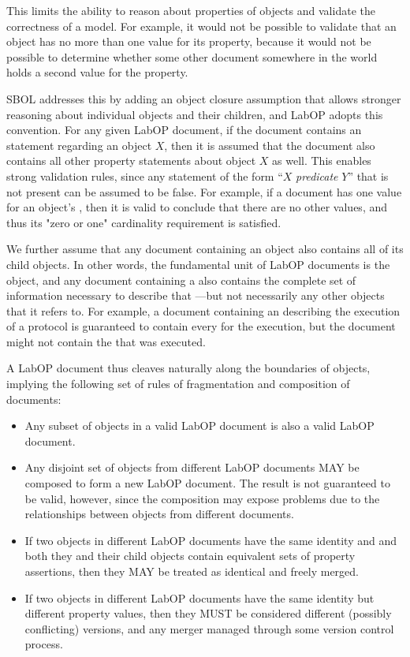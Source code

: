 This limits the ability to reason about properties of objects and validate the correctness of a model.
For example, it would not be possible to validate that an  object has no more than one value for its  property, because it would not be possible to determine whether some other document somewhere in the world holds a second value for the property.

SBOL addresses this by adding an object closure assumption that allows stronger reasoning about individual objects and their children, and LabOP adopts this convention.
For any given LabOP document, if the document contains an  statement regarding an  object $X$, then it is assumed that the document also contains all other property statements about object $X$ as well. 
This enables strong validation rules, since any statement of the form ``$X$ {\it predicate} $Y$'' that is not present can be assumed to be false.
For example, if a document has one value for an object's , then it is valid to conclude that there are no other  values, and thus its "zero or one" cardinality requirement is satisfied.

We further assume that any document containing an object also contains all of its child objects.
In other words, the fundamental unit of LabOP documents is the  object, and any document containing a  also contains the complete set of information necessary to describe that ---but not necessarily any other  objects that it refers to.
For example, a document containing an  describing the execution of a protocol is guaranteed to contain every  for the execution, but the document might not contain the  that was executed.

A LabOP document thus cleaves naturally along the boundaries of  objects, implying the following set of rules of fragmentation and composition of documents:
\begin{itemize}
\item Any subset of  objects in a valid LabOP document is also a valid LabOP document.
\item Any disjoint set of  objects from different LabOP documents MAY be composed to form a new LabOP document. The result is not guaranteed to be valid, however, since the composition may expose problems due to the relationships between  objects from different documents.
\item If two  objects in different LabOP documents have the same identity and and both they and their child objects contain equivalent sets of property assertions, then they MAY be treated as identical and freely merged. 
\item  If two  objects in different LabOP documents have the same identity but different property values, then they MUST be considered different (possibly conflicting) versions, and any merger managed through some version control process.
\end{itemize}


